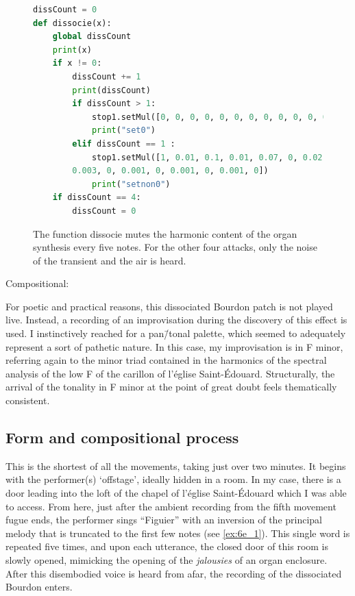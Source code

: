 \documentclass[12pt,twoside,maitrise]{dms_ks}
\theoremstyle{definition}
\begin{document}
{\begin{figure}[H]
\begin{lstlisting}[language=Python]
dissCount = 0
def dissocie(x):
    global dissCount
    print(x)
    if x != 0:
        dissCount += 1
        print(dissCount)
        if dissCount > 1:
            stop1.setMul([0, 0, 0, 0, 0, 0, 0, 0, 0, 0, 0, 0, 0, 0, 0, 0, 0, 0, 0, 0])
            print("set0")
        elif dissCount == 1 :
            stop1.setMul([1, 0.01, 0.1, 0.01, 0.07, 0, 0.02, 0, 0.01, 0, 0.003, 0,
	    0.003, 0, 0.001, 0, 0.001, 0, 0.001, 0])
            print("setnon0")
    if dissCount == 4:
        dissCount = 0
\end{lstlisting}
\caption{The function dissocie mutes the harmonic content of the organ synthesis every five notes. For the other four attacks, only the noise of the transient and the air is heard.}
\label{fig:dissocie}
\end{figure}

Compositional:

For poetic and practical reasons, this dissociated Bourdon patch is not played live.
Instead, a recording of an improvisation during the discovery of this effect is used.
I instinctively reached for a pan\=/tonal palette, which seemed to adequately represent a sort of pathetic nature.
In this case, my improvisation is in F minor, referring again to the minor triad contained in the harmonics of the spectral analysis of the low F of the carillon of l'église Saint-Édouard.
Structurally, the arrival of the tonality in F minor at the point of great doubt feels thematically consistent.

\subsection{Form and compositional process}

This is the shortest of all the movements, taking just over two minutes. It begins with the performer(s) `offstage', ideally hidden in a room. In my case, there is a door leading into the loft of the chapel of l'église Saint-Édouard which I was able to access. 
From here, just after the ambient recording from the fifth movement fugue ends, the performer sings “Figuier” with an inversion of the principal melody that is truncated to the first few notes (see \cref{ex:6e_1}). 
This single word is repeated five times, and upon each utterance, the closed door of this room is slowly opened, mimicking the opening of the \textit{jalousies} of an organ enclosure.
After this disembodied voice is heard from afar, the recording of the dissociated Bourdon enters.

}
\end{document}
